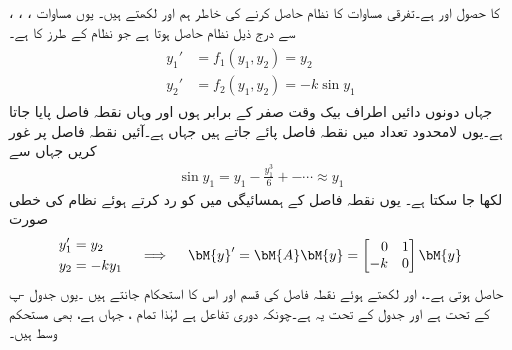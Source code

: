   ، ، ،  کا حصول  اور  ہے۔تفرقی مساوات کا نظام حاصل کرنے کی خاطر ہم  اور  لکھتے ہیں۔ یوں مساوات  سے درج ذیل نظام حاصل ہوتا ہے جو  نظام  کے طرز کا ہے۔
\begin{gather}\label{مساوات_نظام_غیر_خطی_ترکیب_مرحلہ_ٹ}
\begin{aligned}
y_1'&=f_1(y_1,y_2)=y_2\\
y_2'&=f_2(y_1,y_2)=-k\sin y_1
\end{aligned}
\end{gather}
جہاں دونوں دائیں اطراف بیک وقت صفر کے برابر ہوں  اور  وہاں نقطہ فاصل پایا جاتا ہے۔یوں لامحدود تعداد میں نقطہ فاصل  پائے جاتے ہیں جہاں  ہے۔آئیں نقطہ فاصل  پر غور کریں جہاں  سے
\begin{align*}
\sin y_1=y_1-\frac{y_1^3}{6}+-\cdots \approx y_1
\end{align*}
لکھا جا سکتا ہے۔ یوں نقطہ فاصل کے ہمسائیگی میں  کو رد کرتے ہوئے  نظام  کی خطی صورت
\begin{gather}
\begin{aligned}
y_1'&=y_2\\
y_2&=-ky_1
\end{aligned}\quad \implies \quad
\begin{aligned}
\bM{y}'=\bM{A} \bM{y}=\begin{bmatrix*}[r] 0&1\\-k&0 \end{bmatrix*}\bM{y}
\end{aligned}
\end{gather}
حاصل ہوتی ہے۔،  اور  لکھتے ہوئے نقطہ فاصل کی قسم اور اس کا استحکام جانتے ہیں ۔یوں جدول -پ کے تحت   ہے اور جدول  کے تحت یہ   ہے۔چونکہ  دوری تفاعل ہے لہٰذا تمام ، جہاں  ہے،  بھی مستحکم وسط ہیں۔ 
 
